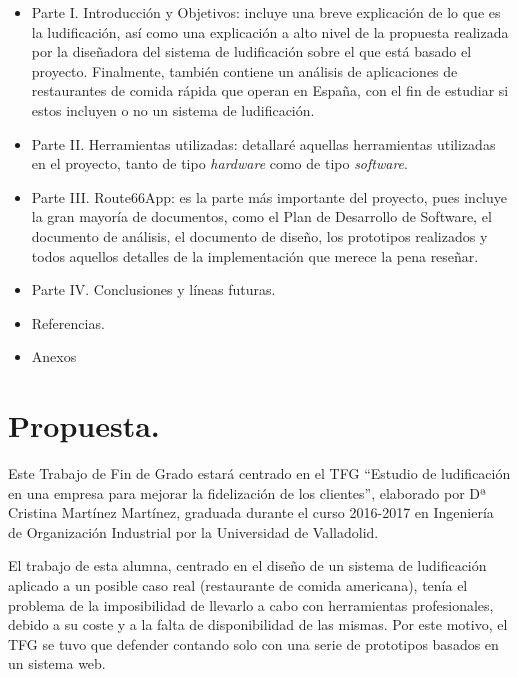 \documentclass[twoside]{report}
\begin{document}
\begin{itemize}
\item Parte I. Introducción y Objetivos: incluye una breve explicación de lo que es la ludificación, así como una explicación a alto nivel de la propuesta realizada por la diseñadora del sistema de ludificación sobre el que está basado el proyecto. Finalmente, también contiene un análisis de aplicaciones de restaurantes de comida rápida que operan en España, con el fin de estudiar si estos incluyen o no un sistema de ludificación.

\item Parte II. Herramientas utilizadas: detallaré aquellas herramientas utilizadas en el proyecto, tanto de tipo \textit{hardware} como de tipo \textit{software}. 

\item Parte III. Route66App: es la parte más importante del proyecto, pues incluye la gran mayoría de documentos, como el Plan de Desarrollo de Software, el documento de análisis, el documento de diseño, los prototipos realizados y todos aquellos detalles de la implementación que merece la pena reseñar.

\item Parte IV. Conclusiones y líneas futuras.

\item Referencias.

\item Anexos

\end{itemize}

\section{Propuesta.}
Este Trabajo de Fin de Grado estará centrado en el TFG “Estudio de ludificación en una empresa para mejorar la fidelización de los clientes”\cite{cristinatfg}, elaborado por Dª Cristina Martínez Martínez, graduada durante el curso 2016-2017 en Ingeniería de Organización Industrial por la Universidad de Valladolid.  

El trabajo de esta alumna, centrado en el diseño de un sistema de ludificación aplicado a un posible caso real (restaurante de comida americana), tenía el problema de la imposibilidad de llevarlo a cabo con herramientas profesionales, debido a su coste y a la falta de disponibilidad de las mismas. Por este motivo, el TFG se tuvo que defender contando solo con una serie de prototipos basados en un sistema web. 
\end{document}
